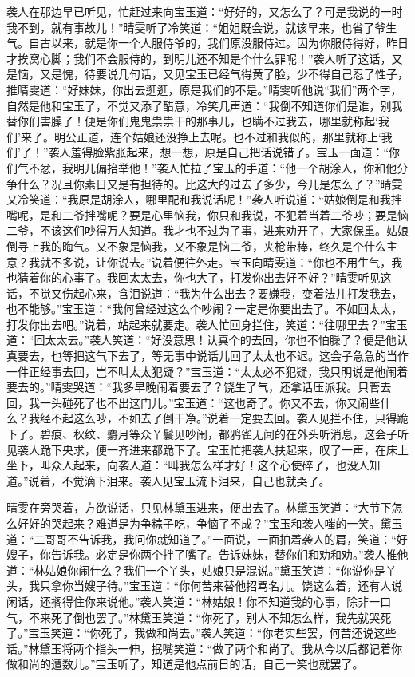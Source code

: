 \documentclass[12pt,oneside]{book}
\begin{document}
袭人在那边早已听见，忙赶过来向宝玉道：“好好的，又怎么了？可是我说的一时我不到，就有事故儿！”晴雯听了冷笑道：“姐姐既会说，就该早来，也省了爷生气。自古以来，就是你一个人服侍爷的，我们原没服侍过。因为你服侍得好，昨日才挨窝心脚；我们不会服侍的，到明儿还不知是个什么罪呢！”袭人听了这话，又是恼，又是愧，待要说几句话，又见宝玉已经气得黄了脸，少不得自己忍了性子，推晴雯道：“好妹妹，你出去逛逛，原是我们的不是。”晴雯听他说“我们”两个字，自然是他和宝玉了，不觉又添了醋意，冷笑几声道：“我倒不知道你们是谁，别我替你们害臊了！便是你们鬼鬼祟祟干的那事儿，也瞒不过我去，哪里就称起‘我们’来了。明公正道，连个姑娘还没挣上去呢。也不过和我似的，那里就称上‘我们’了！”袭人羞得脸紫胀起来，想一想，原是自己把话说错了。宝玉一面道：“你们气不忿，我明儿偏抬举他！”袭人忙拉了宝玉的手道：“他一个胡涂人，你和他分争什么？况且你素日又是有担待的。比这大的过去了多少，今儿是怎么了？”晴雯又冷笑道：“我原是胡涂人，哪里配和我说话呢！”袭人听说道：“姑娘倒是和我拌嘴呢，是和二爷拌嘴呢？要是心里恼我，你只和我说，不犯着当着二爷吵；要是恼二爷，不该这们吵得万人知道。我才也不过为了事，进来劝开了，大家保重。姑娘倒寻上我的晦气。又不象是恼我，又不象是恼二爷，夹枪带棒，终久是个什么主意？我就不多说，让你说去。”说着便往外走。宝玉向晴雯道：“你也不用生气，我也猜着你的心事了。我回太太去，你也大了，打发你出去好不好？”晴雯听见这话，不觉又伤起心来，含泪说道：“我为什么出去？要嫌我，变着法儿打发我去，也不能够。”宝玉道：“我何曾经过这么个吵闹？一定是你要出去了。不如回太太，打发你出去吧。”说着，站起来就要走。袭人忙回身拦住，笑道：“往哪里去？”宝玉道：“回太太去。”袭人笑道：“好没意思！认真个的去回，你也不怕臊了？便是他认真要去，也等把这气下去了，等无事中说话儿回了太太也不迟。这会子急急的当作一件正经事去回，岂不叫太太犯疑？”宝玉道：“太太必不犯疑，我只明说是他闹着要去的。”晴雯哭道：“我多早晚闹着要去了？饶生了气，还拿话压派我。只管去回，我一头碰死了也不出这门儿。”宝玉道：“这也奇了。你又不去，你又闹些什么？我经不起这么吵，不如去了倒干净。”说着一定要去回。袭人见拦不住，只得跪下了。碧痕、秋纹、麝月等众丫鬟见吵闹，都鸦雀无闻的在外头听消息，这会子听见袭人跪下央求，便一齐进来都跪下了。宝玉忙把袭人扶起来，叹了一声，在床上坐下，叫众人起来，向袭人道：“叫我怎么样才好！这个心使碎了，也没人知道。”说着，不觉滴下泪来。袭人见宝玉流下泪来，自己也就哭了。

晴雯在旁哭着，方欲说话，只见林黛玉进来，便出去了。林黛玉笑道：“大节下怎么好好的哭起来？难道是为争粽子吃，争恼了不成？”宝玉和袭人嗤的一笑。黛玉道：“二哥哥不告诉我，我问你就知道了。”一面说，一面拍着袭人的肩，笑道：“好嫂子，你告诉我。必定是你两个拌了嘴了。告诉妹妹，替你们和劝和劝。”袭人推他道：“林姑娘你闹什么？我们一个丫头，姑娘只是混说。”黛玉笑道：“你说你是丫头，我只拿你当嫂子待。”宝玉道：“你何苦来替他招骂名儿。饶这么着，还有人说闲话，还搁得住你来说他。”袭人笑道：“林姑娘！你不知道我的心事，除非一口气，不来死了倒也罢了。”林黛玉笑道：“你死了，别人不知怎么样，我先就哭死了。”宝玉笑道：“你死了，我做和尚去。”袭人笑道：“你老实些罢，何苦还说这些话。”林黛玉将两个指头一伸，抿嘴笑道：“做了两个和尚了。我从今以后都记着你做和尚的遭数儿。”宝玉听了，知道是他点前日的话，自己一笑也就罢了。
\end{document}
